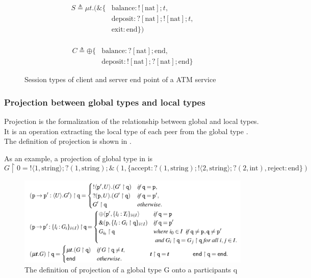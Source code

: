 \begin{figure}[ht]
  \begin{minipage}{0.45\textwidth}
    \begin{align*}
      S \triangleq \mu t.(\&\{ & \text{balance}: ![\text{nat}];t, \\
        & \text{deposit}: ?[\text{nat}];![\text{nat}];t, \\
        & \text{exit}: \text{end}\}) \\
    \end{align*}
  \end{minipage}
  \hfill
  \begin{minipage}{0.45\textwidth}
    \begin{align*}
      C \triangleq \oplus \{ &\text{balance}: ?[\text{nat}];\text{end}, \\
                             &\text{deposit}: ![\text{nat}];?[\text{nat}];\text{end} \} 
    \end{align*}
  \end{minipage}
  \caption{Session types of client and server end point of a ATM service}
  \label{b:mpst:ltex}
\end{figure}
\subsubsection{Projection between global types and local types} \label{b:mpst:proj}
Projection is the formalization of the relationship between global and local types. It is an operation extracting the local type of each peer from the global type \cite{coppoGentleIntroductionMultiparty2015}. The definition of projection is shown in .

As an example, a projection of global type in  is
$$
  G \upharpoonright 0 = !\langle 1, \text{string} \rangle;?(1, \text{string});\&(1, \{ \text{accept}: ?(1, \text{string});!\langle 2, \text{string} \rangle;?(2, \text{int}), 
  \text{reject}: \text{end} \})
$$  
\begin{figure}[H]
\includegraphics[width=\textwidth]{background/image/proj-def.png}
\caption{The definition of projection of a global type G onto a participants q\cite{coppoGentleIntroductionMultiparty2015}}
\label{b:mpst:pdef}
\end{figure}
